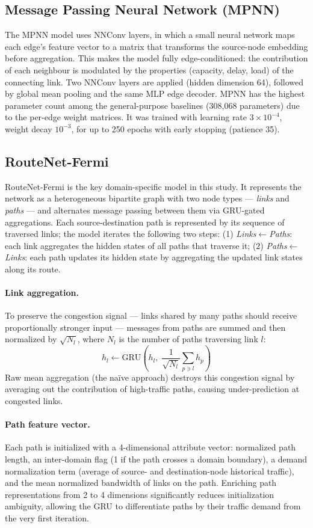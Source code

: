 \documentclass[12pt]{article}
\begin{document}
\subsection{Message Passing Neural Network (MPNN)}
The MPNN model \cite{mpnnGilmer} uses NNConv layers, in which a small neural network maps each edge's feature vector to a matrix that transforms the source-node embedding before aggregation. This makes the model fully edge-conditioned: the contribution of each neighbour is modulated by the properties (capacity, delay, load) of the connecting link. Two NNConv layers are applied (hidden dimension 64), followed by global mean pooling and the same MLP edge decoder. MPNN has the highest parameter count among the general-purpose baselines (308,068 parameters) due to the per-edge weight matrices. It was trained with learning rate $3 \times 10^{-4}$, weight decay $10^{-3}$, for up to 250 epochs with early stopping (patience 35).

\subsection{RouteNet-Fermi}
RouteNet-Fermi \cite{routeNet} is the key domain-specific model in this study. It represents the network as a heterogeneous bipartite graph with two node types — \emph{links} and \emph{paths} — and alternates message passing between them via GRU-gated aggregations. Each source-destination path is represented by its sequence of traversed links; the model iterates the following two steps: (1) \emph{Links$\leftarrow$Paths}: each link aggregates the hidden states of all paths that traverse it; (2) \emph{Paths$\leftarrow$Links}: each path updates its hidden state by aggregating the updated link states along its route.

\paragraph{Link aggregation.} To preserve the congestion signal — links shared by many paths should receive proportionally stronger input — messages from paths are summed and then normalized by $\sqrt{N_l}$, where $N_l$ is the number of paths traversing link $l$:
\[ h_l \leftarrow \text{GRU}\!\left(h_l,\; \frac{1}{\sqrt{N_l}} \sum_{p \ni l} h_p\right) \]
Raw mean aggregation (the na\"ive approach) destroys this congestion signal by averaging out the contribution of high-traffic paths, causing under-prediction at congested links.

\paragraph{Path feature vector.} Each path is initialized with a 4-dimensional attribute vector: normalized path length, an inter-domain flag (1 if the path crosses a domain boundary), a demand normalization term (average of source- and destination-node historical traffic), and the mean normalized bandwidth of links on the path. Enriching path representations from 2 to 4 dimensions significantly reduces initialization ambiguity, allowing the GRU to differentiate paths by their traffic demand from the very first iteration.
\end{document}
